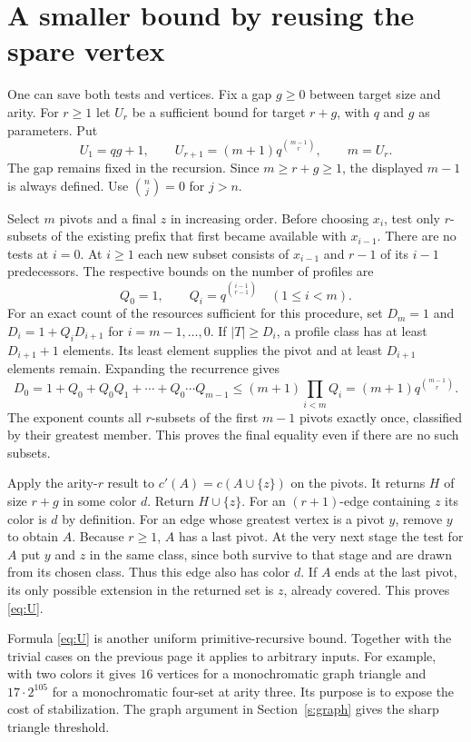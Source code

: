 \documentclass[11pt,letterpaper]{article}
\newcommand{\head}[1]{\section{#1}}
\begin{document}
\head{A smaller bound by reusing the spare vertex}\label{s:refine}
One can save both tests and vertices. Fix a gap $g\ge0$ between target size and arity. For $r\ge1$ let $U_r$ be a sufficient bound for target $r+g$, with $q$ and $g$ as parameters. Put
\begin{equation}
 U_1=qg+1,\qquad
 U_{r+1}=(m+1)q^{\binom{m-1}{r}},\qquad m=U_r .        \tag{3}\label{eq:U}
\end{equation}
The gap remains fixed in the recursion. Since $m\ge r+g\ge1$, the displayed $m-1$ is always defined. Use $\binom{n}{j}=0$ for $j>n$.

Select $m$ pivots and a final $z$ in increasing order. Before choosing $x_i$, test only $r$-subsets of the existing prefix that first became available with $x_{i-1}$. There are no tests at $i=0$. At $i\ge1$ each new subset consists of $x_{i-1}$ and $r-1$ of its $i-1$ predecessors. The respective bounds on the number of profiles are
\[
         Q_0=1,\qquad Q_i=q^{\binom{i-1}{r-1}} \quad (1\le i<m).
\]
For an exact count of the resources sufficient for this procedure, set $D_m=1$ and $D_i=1+Q_iD_{i+1}$ for $i=m-1,\ldots,0$. If $|T|\ge D_i$, a profile class has at least $D_{i+1}+1$ elements. Its least element supplies the pivot and at least $D_{i+1}$ elements remain. Expanding the recurrence gives
\[
 D_0=1+Q_0+Q_0Q_1+\cdots+Q_0\cdots Q_{m-1}
       \le (m+1)\prod_{i<m}Q_i=(m+1)q^{\binom{m-1}{r}} .
\]
The exponent counts all $r$-subsets of the first $m-1$ pivots exactly once, classified by their greatest member. This proves the final equality even if there are no such subsets.

Apply the arity-$r$ result to $c'(A)=c(A\cup\{z\})$ on the pivots. It returns $H$ of size $r+g$ in some color $d$. Return $H\cup\{z\}$. For an $(r+1)$-edge containing $z$ its color is $d$ by definition. For an edge whose greatest vertex is a pivot $y$, remove $y$ to obtain $A$. Because $r\ge1$, $A$ has a last pivot. At the very next stage the test for $A$ put $y$ and $z$ in the same class, since both survive to that stage and are drawn from its chosen class. Thus this edge also has color $d$. If $A$ ends at the last pivot, its only possible extension in the returned set is $z$, already covered. This proves \eqref{eq:U}.

Formula \eqref{eq:U} is another uniform primitive-recursive bound. Together with the trivial cases on the previous page it applies to arbitrary inputs. For example, with two colors it gives $16$ vertices for a monochromatic graph triangle and $17\cdot 2^{105}$ for a monochromatic four-set at arity three. Its purpose is to expose the cost of stabilization. The graph argument in Section~\ref{s:graph} gives the sharp triangle threshold.
\clearpage
\end{document}
